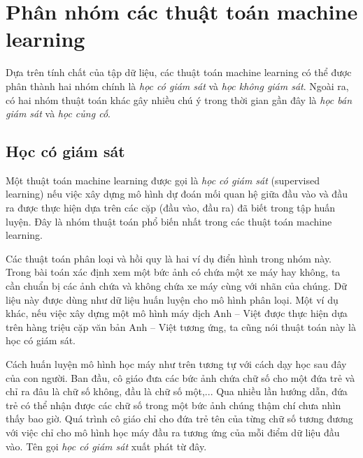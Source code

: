 
\section{Phân nhóm các thuật toán machine learning}
Dựa trên tính chất của tập dữ liệu, các thuật toán machine learning có thể
được phân thành hai nhóm chính là \textit{học có giám sát} và \textit{học không giám sát}. Ngoài ra, có hai nhóm thuật toán khác gây nhiều chú ý trong thời gian gần đây là \textit{học bán giám sát} và \textit{học củng cố}.

\subsection{Học có giám sát}
Một thuật toán machine learning được gọi là \textit{học có giám sát} (supervised learning) nếu việc xây dựng mô hình dự đoán mối quan hệ giữa đầu vào và đầu ra được thực hiện dựa trên các cặp (đầu vào, đầu ra) đã biết trong tập huấn luyện. Đây là nhóm thuật toán phổ biến nhất trong các thuật toán machine learning. 

Các thuật toán phân loại và hồi quy là hai ví dụ điển hình trong nhóm này. Trong bài toán xác định xem một bức ảnh có chứa một xe máy hay không, ta cần chuẩn bị các ảnh chứa và không chứa xe máy cùng với nhãn của chúng. Dữ liệu này được dùng như dữ liệu huấn luyện cho mô hình phân loại. Một ví dụ khác, nếu việc xây dựng một mô hình máy dịch Anh -- Việt được thực hiện dựa trên hàng triệu cặp văn bản Anh -- Việt tương ứng, ta cũng nói thuật toán này là học có giám sát. 

Cách huấn luyện mô hình học máy như trên tương tự với cách dạy học sau đây của
con người. Ban đầu, cô giáo đưa các bức ảnh chứa chữ số cho một đứa trẻ và chỉ
ra đâu là chữ số không, đầu là chữ số một,... Qua nhiều lần hướng dẫn, đứa trẻ
có thể nhận được các chữ số trong một bức ảnh chúng thậm chí chưa nhìn thấy bao
giờ. Quá trình cô giáo chỉ cho đứa trẻ tên của từng chữ số tương đương với việc
chỉ cho mô hình học máy đầu ra tương ứng của mỗi điểm dữ liệu đầu vào. Tên gọi
\textit{học có giám sát} xuất phát từ đây.


